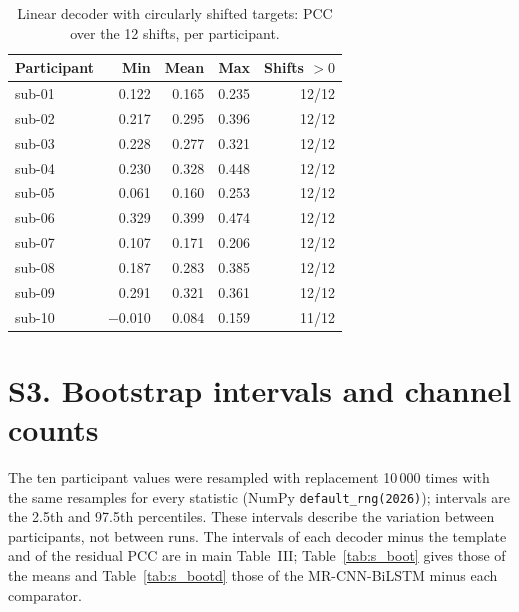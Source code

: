\documentclass[10pt,a4paper]{article}
\begin{document}
\begin{table}[H]\centering\small
\caption{Linear decoder with circularly shifted targets: PCC over the 12 shifts, per participant.}\label{tab:s_shift}
\begin{tabular}{lrrrr}
\toprule
Participant & Min & Mean & Max & Shifts $>0$ \\
\midrule
sub-01 & 0.122 & 0.165 & 0.235 & 12/12 \\
sub-02 & 0.217 & 0.295 & 0.396 & 12/12 \\
sub-03 & 0.228 & 0.277 & 0.321 & 12/12 \\
sub-04 & 0.230 & 0.328 & 0.448 & 12/12 \\
sub-05 & 0.061 & 0.160 & 0.253 & 12/12 \\
sub-06 & 0.329 & 0.399 & 0.474 & 12/12 \\
sub-07 & 0.107 & 0.171 & 0.206 & 12/12 \\
sub-08 & 0.187 & 0.283 & 0.385 & 12/12 \\
sub-09 & 0.291 & 0.321 & 0.361 & 12/12 \\
sub-10 & $-$0.010 & 0.084 & 0.159 & 11/12 \\
\bottomrule
\end{tabular}
\end{table}

\section*{S3. Bootstrap intervals and channel counts}

The ten participant values were resampled with replacement 10\,000 times with the same resamples for every statistic (NumPy \texttt{default\_rng(2026)}); intervals are the 2.5th and 97.5th percentiles. These intervals describe the variation between participants, not between runs. The intervals of each decoder minus the template and of the residual PCC are in main Table~III; Table~\ref{tab:s_boot} gives those of the means and Table~\ref{tab:s_bootd} those of the MR-CNN-BiLSTM minus each comparator.
\end{document}
